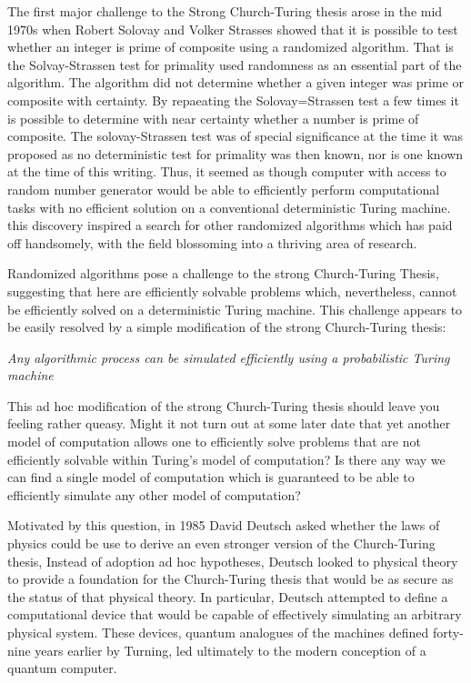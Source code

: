 \documentclass[12pt, oneside]{book}
\theoremstyle{definition}
\theoremstyle{definition}
\theoremstyle{remark}
\begin{document}
The first major challenge to the Strong Church-Turing thesis arose in the mid 1970s when Robert Solovay and Volker Strasses showed that it is possible to test whether an integer is prime of composite using a randomized algorithm. That is the Solvay-Strassen test for primality used randomness as an essential part of the algorithm. The algorithm did not determine whether a given integer was prime or composite with certainty. By repaeating the Solovay=Strassen test a few times it is possible to determine with near certainty whether a number is prime of composite. The solovay-Strassen test was of special significance at the time it was proposed as no deterministic test for primality was then known, nor is one known at the time of this writing. Thus, it seemed as though computer with access to random number generator would be able to efficiently perform computational tasks with no efficient solution on a conventional deterministic Turing machine. this discovery inspired a search for other randomized algorithms which has paid off handsomely, with the field blossoming into a thriving area of research.

Randomized algorithms pose a challenge to the strong Church-Turing Thesis, suggesting that here are efficiently solvable problems which, nevertheless, cannot be efficiently solved on a deterministic Turing machine. This challenge appears to be easily resolved by a simple modification of the strong Church-Turing thesis:

\textit{Any algorithmic process can be simulated efficiently using a probabilistic Turing machine}

This ad hoc modification of the strong Church-Turing thesis should leave you feeling rather queasy. Might it not turn out at some later date that yet another model of computation allows one to efficiently solve problems that are not efficiently solvable within Turing's model of computation? Is there any way we can find a single model of computation which is guaranteed to be able to efficiently simulate any other model of computation?

Motivated by this question, in 1985 David Deutsch asked whether the laws of physics could be use to derive an even stronger version of the Church-Turing thesis, Instead of adoption ad hoc hypotheses, Deutsch looked to physical theory to provide a foundation for the Church-Turing thesis that would be as secure as the status of that physical theory. In particular, Deutsch attempted to define a computational device that would be capable of effectively simulating an arbitrary physical system. These devices, quantum analogues of the machines defined forty-nine years earlier by Turning, led ultimately to the modern conception of a quantum computer.
\end{document}
